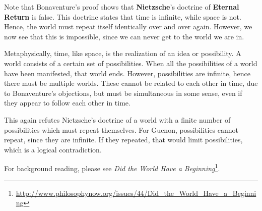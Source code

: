 Note that Bonaventure's proof shows that \textbf{Nietzsche}'s doctrine of \textbf{Eternal Return} is false. This doctrine states that time is infinite, while space is not. Hence, the world must repeat itself identically over and over again. However, we now see that this is impossible, since we can never get to the world we are in.

Metaphysically, time, like space, is the realization of an idea or possibility. A world consists of a certain set of possibilities. When all the possibilities of a world have been manifested, that world ends. However, possibilities are infinite, hence there must be multiple worlds. These cannot be related to each other in time, due to Bonaventure's objections, but must be simultaneous in some sense, even if they appear to follow each other in time.

This again refutes Nietzsche's doctrine of a world with a finite number of possibilities which must repeat themselves. For Guenon, possibilities cannot repeat, since they are infinite. If they repeated, that would limit possibilities, which is a logical contradiction.

For background reading, please see \textit{Did the World Have a Beginning}\footnote{\url{http://www.philosophynow.org/issues/44/Did_the_World_Have_a_Beginning}}.



